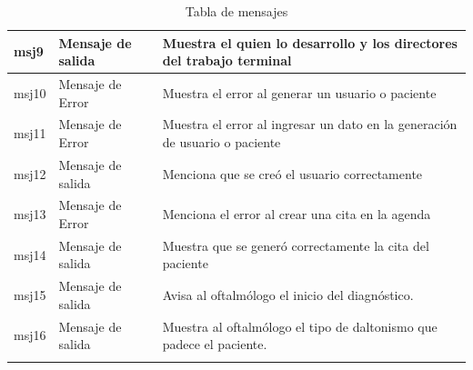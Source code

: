 \documentclass[10pt]{article}
\begin{document}
\begin{longtable}{|p{5.0cm}|p{3.5cm}|p{6.5cm}|}
msj9 & Mensaje de salida & Muestra el quien lo desarrollo y los directores del trabajo terminal \\
\hline

msj10 & Mensaje de Error & Muestra el error al generar un usuario o paciente \\
\hline

msj11 & Mensaje de Error &  Muestra el error al ingresar un dato en la generación de usuario o paciente\\
\hline

msj12 & Mensaje de salida & Menciona que se creó el usuario correctamente \\
\hline

msj13 & Mensaje de Error & Menciona el error al crear una cita en la agenda \\
\hline
msj14 & Mensaje de salida & Muestra que se generó correctamente la cita del paciente \\
\hline
msj15 & Mensaje de salida & Avisa al oftalmólogo el inicio del diagnóstico.\\
\hline
msj16 & Mensaje de salida & Muestra al oftalmólogo el tipo de daltonismo que padece el paciente. \\
\hline
\caption{Tabla de mensajes}
\label{tabla1}
\end{longtable}

\newpage
\end{document}
